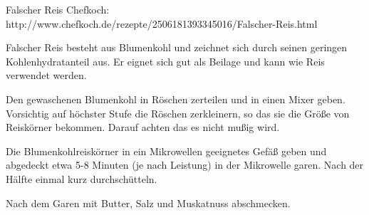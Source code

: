 \begin{recipe}[]{ Falscher Reis }{ Chefkoch: http://www.chefkoch.de/rezepte/2506181393345016/Falscher-Reis.html }{  }

Falscher Reis besteht aus Blumenkohl und zeichnet sich durch seinen geringen Kohlenhydratanteil aus. Er eignet sich gut als Beilage und kann wie Reis verwendet werden.



\step
Den gewaschenen Blumenkohl in Röschen zerteilen und in einen Mixer geben. Vorsichtig auf höchster Stufe die Röschen zerkleinern, so das sie die Größe von Reiskörner bekommen. Darauf achten das es nicht mußig wird.

\step
Die Blumenkohlreiskörner in ein Mikrowellen geeignetes Gefäß geben und abgedeckt etwa 5-8 Minuten (je nach Leistung) in der Mikrowelle garen. Nach der Hälfte einmal kurz durchschütteln.

\step
Nach dem Garen mit Butter, Salz und Muskatnuss abschmecken.


\end{recipe}
